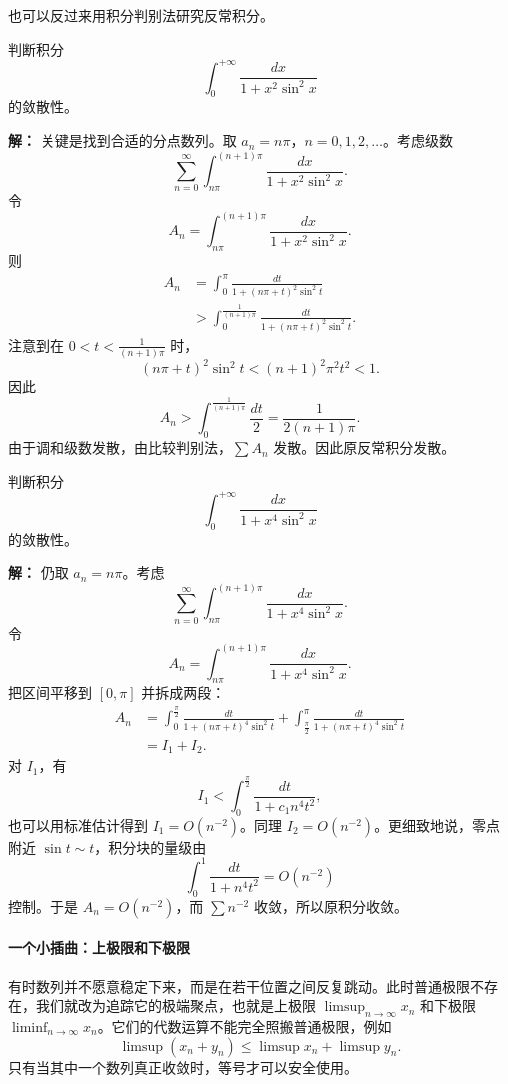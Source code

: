 也可以反过来用积分判别法研究反常积分。

\newpage

\begin{example}
判断积分
\[
    \int_0^{+\infty}\frac{dx}{1+x^2\sin^2x}
\]
的敛散性。

\textbf{解：} 关键是找到合适的分点数列。取 $a_n=n\pi$，$n=0,1,2,\dots$。考虑级数
\[
    \sum_{n=0}^{\infty}\int_{n\pi}^{(n+1)\pi}\frac{dx}{1+x^2\sin^2x}.
\]
令
\[
    A_n=\int_{n\pi}^{(n+1)\pi}\frac{dx}{1+x^2\sin^2x}.
\]
则
\[
\begin{aligned}
A_n
&=\int_0^{\pi}\frac{dt}{1+(n\pi+t)^2\sin^2t}  \\
&>\int_0^{\frac{1}{(n+1)\pi}}\frac{dt}{1+(n\pi+t)^2\sin^2t}.
\end{aligned}
\]
注意到在 $0<t<\frac{1}{(n+1)\pi}$ 时，
\[
    (n\pi+t)^2\sin^2t<(n+1)^2\pi^2t^2<1.
\]
因此
\[
    A_n>\int_0^{\frac{1}{(n+1)\pi}}\frac{dt}{2}
    =\frac{1}{2(n+1)\pi}.
\]
由于调和级数发散，由比较判别法，$\sum A_n$ 发散。因此原反常积分发散。
\end{example}

\newpage

\begin{example}
判断积分
\[
    \int_0^{+\infty}\frac{dx}{1+x^4\sin^2x}
\]
的敛散性。

\textbf{解：} 仍取 $a_n=n\pi$。考虑
\[
    \sum_{n=0}^{\infty}\int_{n\pi}^{(n+1)\pi}\frac{dx}{1+x^4\sin^2x}.
\]
令
\[
    A_n=\int_{n\pi}^{(n+1)\pi}\frac{dx}{1+x^4\sin^2x}.
\]
把区间平移到 $[0,\pi]$ 并拆成两段：
\[
\begin{aligned}
A_n
&=\int_0^{\frac{\pi}{2}}\frac{dt}{1+(n\pi+t)^4\sin^2t}
 +\int_{\frac{\pi}{2}}^{\pi}\frac{dt}{1+(n\pi+t)^4\sin^2t}  \\
&=I_1+I_2.
\end{aligned}
\]
对 $I_1$，有
\[
I_1<\int_0^{\frac{\pi}{2}}\frac{dt}{1+c_1 n^4 t^2},
\]
也可以用标准估计得到 $I_1=O(n^{-2})$。同理 $I_2=O(n^{-2})$。更细致地说，零点附近 $\sin t\sim t$，积分块的量级由
\[
    \int_0^1\frac{dt}{1+n^4t^2}=O(n^{-2})
\]
控制。于是 $A_n=O(n^{-2})$，而 $\sum n^{-2}$ 收敛，所以原积分收敛。
\end{example}

\paragraph{一个小插曲：上极限和下极限}

有时数列并不愿意稳定下来，而是在若干位置之间反复跳动。此时普通极限不存在，我们就改为追踪它的极端聚点，也就是上极限 $\limsup_{n\to\infty}x_n$ 和下极限 $\liminf_{n\to\infty}x_n$。它们的代数运算不能完全照搬普通极限，例如
\[
    \limsup(x_n+y_n)\leq \limsup x_n+\limsup y_n.
\]
只有当其中一个数列真正收敛时，等号才可以安全使用。

